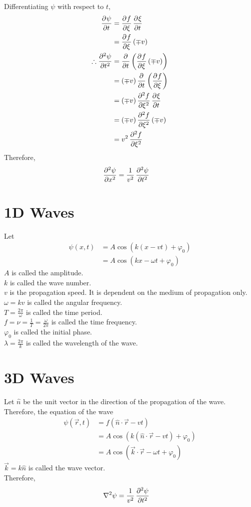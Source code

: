 \documentclass[fleqn, a4paper, 12pt, twoside]{article}
\theoremstyle{definition}
\theoremstyle{theorem}
\begin{document}
Differentiating $\psi$ with respect to $t$,
\begin{align*}
	\dpd{\psi}{t} &= \dpd{f}{\xi} \dpd{\xi}{t}\\
	&= \dpd{f}{\xi} (\mp v)\\
	\therefore \dpd[2]{\psi}{t} &= \dpd{}{t}\left( \dpd{f}{\xi} (\mp v) \right)\\
	&= (\mp v) \dpd{}{t} \left( \dpd{f}{\xi} \right)\\
	&= (\mp v) \dpd[2]{f}{\xi} \dpd{\xi}{t}\\
	&= (\mp v) \dpd[2]{f}{\xi} (\mp v)\\
	&= v^2 \dpd[2]{f}{\xi}
\end{align*}
Therefore,
\begin{align*}
	\dpd[2]{\psi}{x} &= \frac{1}{v^2} \dpd[2]{\psi}{t}
\end{align*}

\section{1D Waves}

Let
\begin{align*}
	\psi(x,t) &= A \cos\left( k (x - v t) + \varphi_0 \right)\\
	&= A \cos\left( k x - \omega t + \varphi_0 \right)
\end{align*}
$A$ is called the amplitude.\\
$k$ is called the wave number.\\
$v$ is the propagation speed.
It is dependent on the medium of propagation only.\\
$\omega = k v$ is called the angular frequency.\\
$T = \frac{2 \pi}{\omega}$ is called the time period.\\
$f = \nu = \frac{1}{T} = \frac{\omega}{2 \pi}$ is called the time frequency.\\
$\varphi_0$ is called the initial phase.\\
$\lambda = \frac{2 \pi}{k}$ is called the wavelength of the wave.

\section{3D Waves}

Let $\hat{n}$ be the unit vector in the direction of the propagation of the wave.\\
Therefore, the equation of the wave
\begin{align*}
	\psi\left( \overrightarrow{r} , t \right) &= f\left( \hat{n} \cdot \overrightarrow{r} - v t \right)\\
	&= A \cos\left( k \left( \hat{n} \cdot \overrightarrow{r} - v t \right) + \varphi_0 \right)\\
	&= A \cos\left( \overrightarrow{k} \cdot \overrightarrow{r} - \omega t + \varphi_0 \right)
\end{align*}
$\overrightarrow{k} = k \hat{n}$ is called the wave vector.\\
Therefore,
\begin{align*}
	\nabla^2 \psi &= \frac{1}{v^2} \dpd[2]{\psi}{t}
\end{align*}
\end{document}
